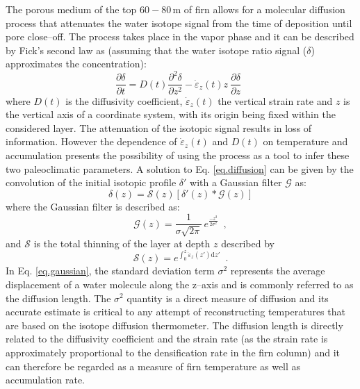 \documentclass[11pt, draftcls, onecolumn]{IEEEtran} %
\numberwithin{equation}{section}
\numberwithin{table}{section}
\numberwithin{figure}{section}
\begin{document}
The porous medium of the top $60-80\, \mathrm{m}$ of firn allows for a molecular diffusion process that attenuates
the water isotope signal from the time of deposition until  pore close--off. 
The process takes place in the vapor phase and it can be described by Fick's second law as
(assuming that the water isotope ratio signal ($\delta$) approximates the concentration):
\begin{equation}
\frac{\partial \delta}{\partial t} = D \left( t \right) \frac{\partial^2 \delta}{\partial z^2} - 
\dot{\varepsilon}_z \left( t \right) z ~\frac{\partial \delta}{\partial z} \enspace 
\label{eq.diffusion}
\end{equation}
where $D \left( t \right)$ is the diffusivity coefficient, $\dot{\varepsilon}_z\left(t\right)$
the vertical strain rate and  $z$ is the vertical axis of a coordinate system, 
with its origin being fixed within the considered layer.
The attenuation of the isotopic signal results in loss of information.
However the dependence of $\dot{\varepsilon}_z\left(t\right)$  and $D \left( t \right)$ 
on temperature and accumulation presents the possibility of using the process as a tool
to infer these two paleoclimatic parameters. A solution to Eq. \ref{eq.diffusion} can be given by
the convolution of the initial isotopic profile $\delta'$ with a Gaussian filter $\mathcal{G}$ as:
\begin{equation}
\delta \left( z\right) = \mathcal{S} \left( z \right) \left[ \delta ' \left( z \right) 
\ast \mathcal{G} \left( z \right) \right]
\label{eq.convolution}
\end{equation}
where the Gaussian filter is described as:
\begin{equation}
\mathcal{G}\left(z \right) = \frac{1}{\sigma \sqrt{2\pi}} \, e^{\frac{-z^2}{2 \sigma^2}} \enspace ,
\label{eq.gaussian}
\end{equation}
and $\mathcal{S}$ is the total thinning of the layer at depth $z$ described by
\begin{equation}
\mathcal{S} \left( z \right) = e^{\int_0^{z} \dot{\varepsilon}_z \left( z' \right) \mathrm{d}z'} \enspace .
\label{eq.thinning}
\end{equation}
In Eq. \ref{eq.gaussian}, the standard deviation term $\sigma^2$ represents the average 
displacement of a water molecule along the z--axis and is commonly referred to as the diffusion length.
The $\sigma^2$ quantity is a direct measure of diffusion and its accurate estimate is critical
to any attempt of reconstructing temperatures that are based on the isotope diffusion thermometer.  
The diffusion length is directly related to the diffusivity coefficient and the strain rate 
(as the strain rate is approximately proportional to the densification rate in the firn column)
and it can therefore be regarded as a measure of firn temperature as well as accumulation rate.
\end{document}
